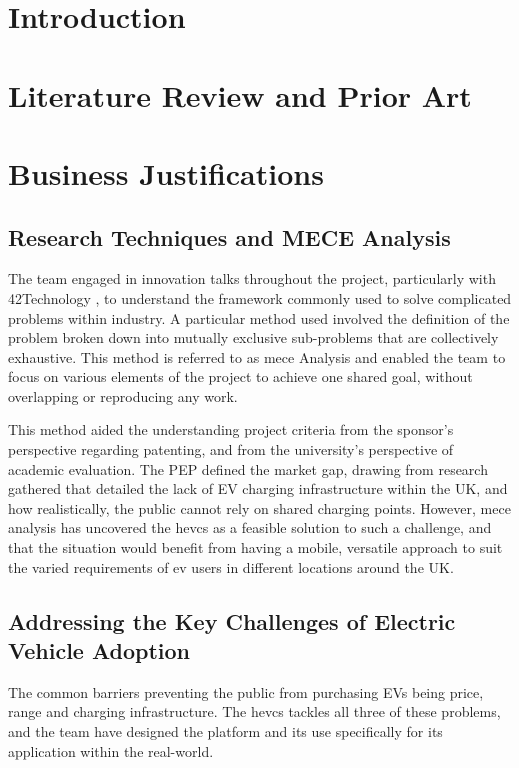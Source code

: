 \documentclass [12pt]{article}
\begin{document}
\section{Introduction}
\setcounter{page}{1}

\newpage
\section{Literature Review and Prior Art}


\newpage
\section{Business Justifications}

\subsection{Research Techniques and MECE Analysis}

The team engaged in innovation talks throughout the project, particularly with 42Technology \cite{42T}, to understand the framework commonly used to solve complicated problems within industry. A particular method used involved the definition of the problem broken down into mutually exclusive sub-problems that are collectively exhaustive. This method is referred to as \gls{mece} Analysis and enabled the team to focus on various elements of the project to achieve one shared goal, without overlapping or reproducing any work. 

This method aided the understanding project criteria from the sponsor’s perspective regarding patenting, and from the university’s perspective of academic evaluation. The PEP defined the market gap, drawing from research gathered that detailed the lack of EV charging infrastructure within the UK, and how realistically, the public cannot rely on shared charging points. However, \gls{mece} analysis has uncovered the \gls{hevcs} as a feasible solution to such a challenge, and that the situation would benefit from having a mobile, versatile approach to suit the varied requirements of \gls{ev} users in different locations around the UK. 

\subsection{Addressing the Key Challenges of Electric Vehicle Adoption}

The common barriers preventing the public from purchasing EVs being price, range and charging infrastructure. The \gls{hevcs} tackles all three of these problems, and the team have designed the platform and its use specifically for its application within the real-world. 
\end{document}
